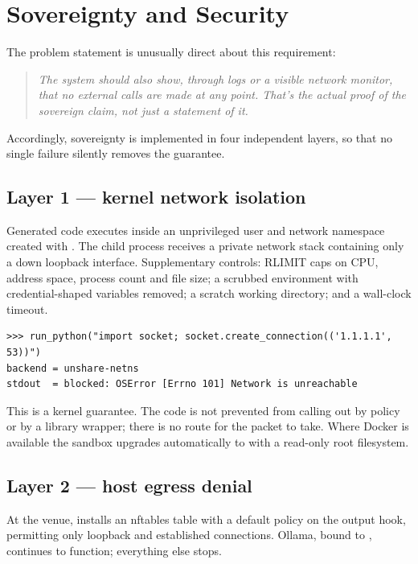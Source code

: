 \section{Sovereignty and Security}
\label{sec:sovereignty}

The problem statement is unusually direct about this requirement:

\begin{quote}\itshape
The system should also show, through logs or a visible network monitor, that no
external calls are made at any point. That's the actual proof of the sovereign
claim, not just a statement of it.
\end{quote}

Accordingly, sovereignty is implemented in four independent layers, so that no
single failure silently removes the guarantee.

\subsection{Layer 1 --- kernel network isolation}

Generated code executes inside an unprivileged user and network namespace
created with . The child process receives a private network
stack containing only a down loopback interface. Supplementary controls: RLIMIT
caps on CPU, address space, process count and file size; a scrubbed environment
with credential-shaped variables removed; a scratch working directory; and a
wall-clock timeout.

\begin{lstlisting}
>>> run_python("import socket; socket.create_connection(('1.1.1.1', 53))")
backend = unshare-netns
stdout  = blocked: OSError [Errno 101] Network is unreachable
\end{lstlisting}

\noindent This is a kernel guarantee. The code is not prevented from calling
out by policy or by a library wrapper; there is no route for the packet to
take. Where Docker is available the sandbox upgrades automatically to
 with a read-only root filesystem.

\subsection{Layer 2 --- host egress denial}

At the venue,  installs an nftables table with a
default  policy on the output hook, permitting only loopback and
established connections. Ollama, bound to , continues to
function; everything else stops.

